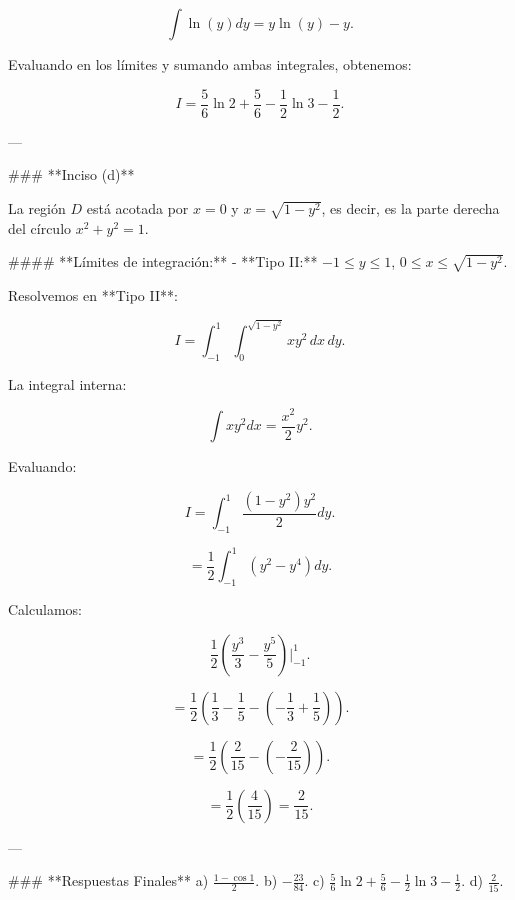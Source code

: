 \[
\int \ln(y) dy = y \ln(y) - y.
\]

Evaluando en los límites y sumando ambas integrales, obtenemos:

\[
I = \frac{5}{6} \ln 2 + \frac{5}{6} - \frac{1}{2} \ln 3 - \frac{1}{2}.
\]

---

### **Inciso (d)**  

La región \( D \) está acotada por \( x = 0 \) y \( x = \sqrt{1 - y^2} \), es decir, es la parte derecha del círculo \( x^2 + y^2 = 1 \).  

#### **Límites de integración:**  
- **Tipo II:** \( -1 \leq y \leq 1 \), \( 0 \leq x \leq \sqrt{1 - y^2} \).  

Resolvemos en **Tipo II**:  

\[
I = \int_{-1}^{1} \int_0^{\sqrt{1 - y^2}} x y^2 \, dx \, dy.
\]

La integral interna:

\[
\int x y^2 dx = \frac{x^2}{2} y^2.
\]

Evaluando:

\[
I = \int_{-1}^{1} \frac{(1 - y^2) y^2}{2} dy.
\]

\[
= \frac{1}{2} \int_{-1}^{1} (y^2 - y^4) dy.
\]

Calculamos:

\[
\frac{1}{2} \left( \frac{y^3}{3} - \frac{y^5}{5} \right) \Big|_{-1}^{1}.
\]

\[
= \frac{1}{2} \left( \frac{1}{3} - \frac{1}{5} - (-\frac{1}{3} + \frac{1}{5}) \right).
\]

\[
= \frac{1}{2} \left( \frac{2}{15} - (-\frac{2}{15}) \right).
\]

\[
= \frac{1}{2} \left( \frac{4}{15} \right) = \frac{2}{15}.
\]

---

### **Respuestas Finales**  
a) \( \frac{1 - \cos 1}{2} \).  
b) \( -\frac{23}{84} \).  
c) \( \frac{5}{6} \ln 2 + \frac{5}{6} - \frac{1}{2} \ln 3 - \frac{1}{2} \).  
d) \( \frac{2}{15} \).
